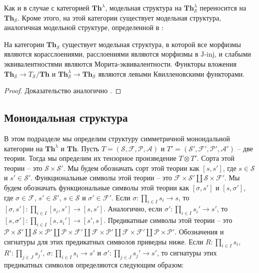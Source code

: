 \documentclass[reqno]{amsart}
\theoremstyle{definition}
\theoremstyle{remark}
\newcommand{\bcat}[1]{\mathbf{#1}}
\newcommand{\Th}{\bcat{Th}}
\newcommand{\I}{\mathrm{I}}
\newcommand{\J}{\mathrm{J}}
\newcommand{\class}[2]{#1\text{-}\mathrm{#2}}
\newcommand{\Iinj}[1][\I]{\class{#1}{inj}}
\newcommand{\Jinj}[1][]{\Iinj[\J#1]}
\begin{document}
Как и в случае с категорией $\Th^\lambda$, модельная структура на $\Th^\lambda_\mathcal{S}$ переносится на $\Th_\mathcal{S}$.
Кроме этого, на этой категории существует модельная структура, аналогичная модельной структуре, определенной в :

\begin{prop}
На категории $\Th_\mathcal{S}$ существует модельная структура, в которой все морфизмы являются корасслоениями, расслоениями являются морфизмы в $\Jinj$, и слабыми эквивалентностями являются Морита-эквивалентности.
Функторы вложения $\Th_\mathcal{S} \to T_\mathcal{S}/\Th$ и $\Th_\mathcal{S}^\lambda \to \Th_\mathcal{S}$ являются левыми Квилленовскими функторами.
\end{prop}
\begin{proof}
Доказательство аналогично .
\end{proof}

\subsection{Моноидальная структура}

В этом подразделе мы определим структуру симметричной моноидальной категории на $\Th^\lambda$ и $\Th$.
Пусть $T = (\mathcal{S},\mathcal{F},\mathcal{P},\mathcal{A})$ и $T' = (\mathcal{S}',\mathcal{F}',\mathcal{P}',\mathcal{A}')$ -- две теории.
Тогда мы определим их тензорное произведение $T \otimes T'$.
Сорта этой теории -- это $\mathcal{S} \times \mathcal{S}'$.
Мы будем обозначать сорт этой теории как $[s,s']$, где $s \in \mathcal{S}$ и $s' \in \mathcal{S}'$.
Функциональные символы этой теории -- это $\mathcal{F} \times \mathcal{S}' \amalg \mathcal{S} \times \mathcal{F'}$.
Мы будем обозначать функциональные символы этой теории как $[\sigma,s']$ и $[s,\sigma']$, где $\sigma \in \mathcal{F}$, $s' \in \mathcal{S}'$, $s \in \mathcal{S}$ и $\sigma' \in \mathcal{F}'$.
Если $\sigma : \prod_{i \in I} s_i \to s$, то $[\sigma,s'] : \prod_{i \in I} [s_i,s'] \to [s,s']$.
Аналогично, если $\sigma' : \prod_{i \in I} s_i' \to s'$, то $[s,\sigma'] : \prod_{i \in I} [s,s_i'] \to [s',s]$.
Предикатные символы этой теории -- это $\mathcal{P} \times \mathcal{S}' \amalg \mathcal{S} \times \mathcal{P}' \amalg \mathcal{P} \times \mathcal{F}' \amalg \mathcal{F} \times \mathcal{P}' \amalg \mathcal{F} \times \mathcal{F}' \amalg \mathcal{P} \times \mathcal{P}'$.
Обозначения и сигнатуры для этих предикатных символов приведны ниже.
Если $R : \prod_{i \in I} s_i$, $R' : \prod_{j \in J} s_j'$, $\sigma : \prod_{i \in I} s_i \to s'$ и $\sigma' : \prod_{j \in J} s_j' \to s'$, то сигнатуры этих предикатных символов определяются следующим образом:
\end{document}

